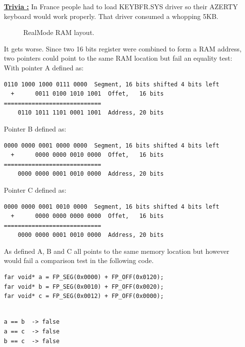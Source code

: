 \documentclass[book.tex]{subfiles}
\begin{document}
\bigskip

\textbf{\underline{Trivia :}}  In France people had to load KEYBFR.SYS driver so their AZERTY keyboard would work properly. That driver consumed a whopping 5KB.

  \begin{figure}[H]
\centering
 
 \caption{RealMode RAM layout.} \label{fig:RealMode_RAM_layout}
 \end{figure}




It gets worse. Since two 16 bits register were combined to form a RAM address, two pointers could point to the same RAM location but fail an equality test:
\bigskip
With pointer A defined as:
\begin{Verbatim}[fontsize=\relsize{-1}]
    0110 1000 1000 0111 0000  Segment, 16 bits shifted 4 bits left  
  +      0011 0100 1010 1001  Offet,   16 bits
============================
    0110 1011 1101 0001 1001  Address, 20 bits
\end{Verbatim}

\bigskip

Pointer B defined as:
\begin{Verbatim}[fontsize=\relsize{-1}]
    0000 0000 0001 0000 0000  Segment, 16 bits shifted 4 bits left  
  +      0000 0000 0010 0000  Offet,   16 bits
============================
    0000 0000 0001 0010 0000  Address, 20 bits
\end{Verbatim}

\bigskip

Pointer C defined as:
\begin{Verbatim}[fontsize=\relsize{-1}]
    0000 0000 0001 0010 0000  Segment, 16 bits shifted 4 bits left  
  +      0000 0000 0000 0000  Offet,   16 bits
============================
    0000 0000 0001 0010 0000  Address, 20 bits
\end{Verbatim}

As defined A, B and C all points to the same memory location but however would fail a comparison test in the following code.\\

\begin{Verbatim}[fontsize=\relsize{-1}]
far void* a = FP_SEG(0x0000) + FP_OFF(0x0120);
far void* b = FP_SEG(0x0010) + FP_OFF(0x0020);
far void* c = FP_SEG(0x0012) + FP_OFF(0x0000);
\end{Verbatim}

\bigskip

\begin{Verbatim}[fontsize=\relsize{-1}]

a == b  -> false
a == c  -> false
b == c  -> false
\end{Verbatim}
\end{document}
